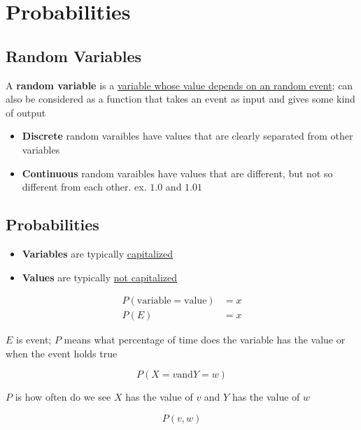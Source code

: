 \section{Probabilities}

  \subsection{Random Variables}

    A \textbf{random variable} is a \ul{variable whose value depends on an random
    event}; can also be considered as a function that takes an event as input and
    gives some kind of output

    \begin{itemize}
      \item \textbf{Discrete} random varaibles have values that are clearly
      separated from other variables
      \item \textbf{Continuous} random varaibles have values that are
      different, but not so different from each other. ex. $ 1.0 $ and $ 1.01 $
    \end{itemize}

  \subsection{Probabilities}

    \begin{itemize}
      \item \textbf{Variables} are typically \ul{capitalized}
      \item \textbf{Values} are typically \ul{not capitalized}
    \end{itemize}

    \begin{align}
      P\left( \text{variable} = \text{value} \right) &= x \\
      P\left( E \right) &= x
    \end{align}

    $ E $ is event; $ P $ means what percentage of time does the
    variable has the value or when the event holds true

    \begin{equation}
      P\left( X = v \text{and} Y = w \right)
    \end{equation}

    $ P $ is how often do we see $ X $ has the value of $ v $ and $ Y $ has
    the value of $ w $

    \begin{equation}
      P\left( v, w \right)
    \end{equation}

